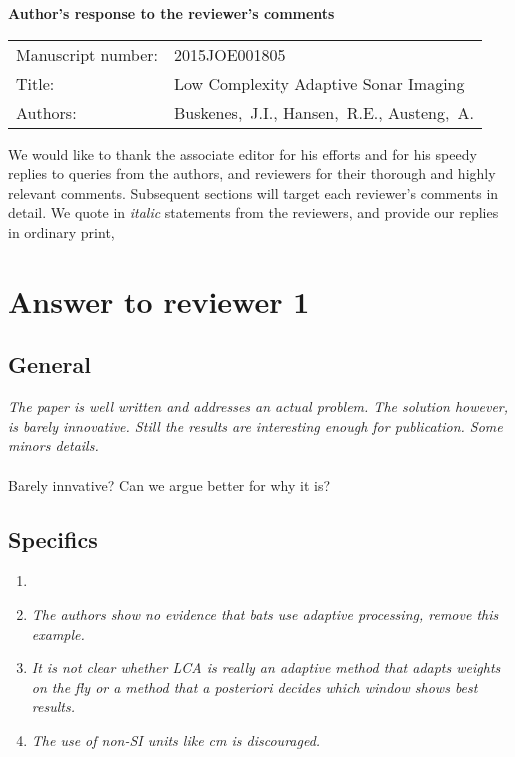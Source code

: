 \documentclass[11pt]{article} %
\newcommand\1{\vec 1}
\newcommand\q[1]{\textit{#1}}
\newcommand\qi[1]{\item\q{#1}}
\newcommand\hi[1]{\item[\textbf{#1}]}
\newcommand\ans[1]{#1}
\newcommand\ai[1]{\\[.5\baselineskip]\ans{#1}}
\begin{document}

\begin{center}\Large\bf
Author's response to the reviewer's comments
\end{center}

\begin{center}
\begin{tabular}{l p{.6\linewidth}}\centering
Manuscript number: & 2015JOE001805 \\
Title: & Low Complexity Adaptive Sonar Imaging \\
Authors: & Buskenes,~J.I., Hansen,~R.E., Austeng,~A.
\end{tabular}
\end{center}

We would like to thank the associate editor for his efforts and for his speedy replies to queries from the authors, and reviewers for their thorough and highly relevant comments. Subsequent sections will target each reviewer's comments in detail. We quote in \textit{italic} statements from the reviewers, and provide our replies in ordinary print, 


\section{Answer to reviewer 1}

\subsection*{General}

\q{The paper is well written and addresses an actual problem. The solution however, is barely innovative. Still the results are interesting enough for publication. Some minors details.} \\\\
\ans{Barely innvative? Can we argue better for why it is?}

\subsection*{Specifics}

\begin{enumerate}
\hi{Introduction}
\qi{The authors show no evidence that bats use adaptive processing, remove this example.}
\ai{}
%
\qi{It is not clear whether LCA is really an adaptive method that adapts weights on the fly or a method that a posteriori decides which window shows best results.}
\ai{}
%
\qi{The use of non-SI units like cm is discouraged.}
\ai{}
%
\end{enumerate}
\end{document}

